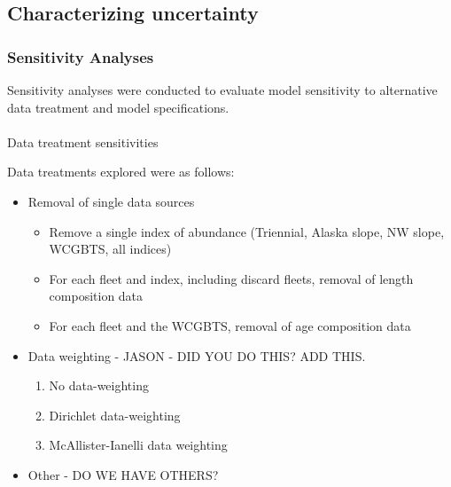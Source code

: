 \documentclass[
]{scrartcl}
\makeatletter
\let\oldparagraph\paragraph
\renewcommand{\paragraph}{
    \@ifstar
      \xxxParagraphStar
      \xxxParagraphNoStar
  }
\newcommand{\xxxParagraphStar}[1]{\oldparagraph*{#1}\mbox{}}
\newcommand{\xxxParagraphNoStar}[1]{\oldparagraph{#1}\mbox{}}
\providecommand{\tightlist}{%
  \setlength{\itemsep}{0pt}\setlength{\parskip}{0pt}}\usepackage{longtable,booktabs,array}
\makeatother
\begin{document}
\newpage{}

\subsection{Characterizing
uncertainty}\label{characterizing-uncertainty}

\subsubsection{Sensitivity Analyses}\label{sec-assmt-sens}

Sensitivity analyses were conducted to evaluate model sensitivity to
alternative data treatment and model specifications.

\paragraph{Data treatment
sensitivities}\label{data-treatment-sensitivities}

Data treatments explored were as follows:

\begin{itemize}
\tightlist
\item
  Removal of single data sources

  \begin{itemize}
  \tightlist
  \item
    Remove a single index of abundance (Triennial, Alaska slope, NW
    slope, WCGBTS, all indices)
  \item
    For each fleet and index, including discard fleets, removal of
    length composition data
  \item
    For each fleet and the WCGBTS, removal of age composition data
  \end{itemize}
\item
  Data weighting - JASON - DID YOU DO THIS? ADD THIS.

  \begin{enumerate}
  \def\labelenumi{\arabic{enumi}.}
  \setcounter{enumi}{10}
  \tightlist
  \item
    No data-weighting
  \item
    Dirichlet data-weighting
  \item
    McAllister-Ianelli data weighting
  \end{enumerate}
\item
  Other - DO WE HAVE OTHERS?
\end{itemize}
\end{document}
